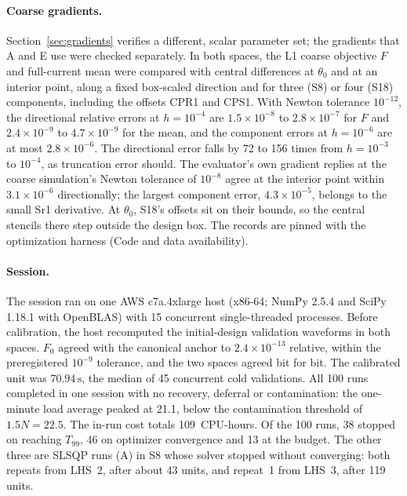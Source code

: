 \documentclass{anvil-paper}
\begin{document}
\paragraph{Coarse gradients.}
Section~\ref{sec:gradients} verifies a different, scalar parameter set; the
gradients that A and E use were checked separately. In both spaces, the L1
coarse objective $F$ and full-current mean were compared with central
differences at $\theta_0$ and at an interior point, along a fixed
box-scaled direction and for three (S8) or four (S18) components,
including the offsets CPR1 and CPS1. With Newton tolerance $10^{-12}$, the
directional relative errors at $h=10^{-4}$ are $1.5\times10^{-8}$ to
$2.8\times10^{-7}$ for $F$ and $2.4\times10^{-9}$ to $4.7\times10^{-9}$ for
the mean, and the component errors at $h=10^{-6}$ are at most
$2.8\times10^{-6}$. The directional error falls by 72 to 156 times from
$h=10^{-3}$ to $10^{-4}$, as truncation error should. The evaluator's own
gradient replies at the coarse simulation's Newton tolerance of $10^{-8}$ agree at
the interior point within $3.1\times10^{-6}$ directionally; the largest
component error, $4.3\times10^{-5}$, belongs to the small Sr1 derivative.
At $\theta_0$, S18's offsets sit on their bounds, so the central
stencils there step outside the design box. The records are pinned with the
optimization harness (Code and data availability).

\paragraph{Session.}
The session ran on one AWS c7a.4xlarge host (x86-64; NumPy 2.5.4 and
SciPy 1.18.1 with OpenBLAS) with 15 concurrent single-threaded processes.
Before calibration, the host recomputed the initial-design validation
waveforms in both spaces. $F_0$ agreed with the canonical anchor to
$2.4\times10^{-13}$ relative, within the preregistered $10^{-9}$ tolerance,
and the two spaces agreed bit for bit. The calibrated unit was
$70.94\,\mathrm{s}$, the median of 45 concurrent cold validations. All 100
runs completed in one session with no recovery, deferral or contamination:
the one-minute load average peaked at 21.1, below the contamination
threshold of $1.5N=22.5$. The in-run cost totals 109~CPU-hours. Of the
100 runs, 38 stopped on reaching $T_{99}$, 46 on optimizer convergence and
13 at the budget. The other three are SLSQP runs (A) in S8 whose
solver stopped without converging: both repeats from LHS~2, after about 43
units, and repeat~1 from LHS~3, after 119 units.
\end{document}
